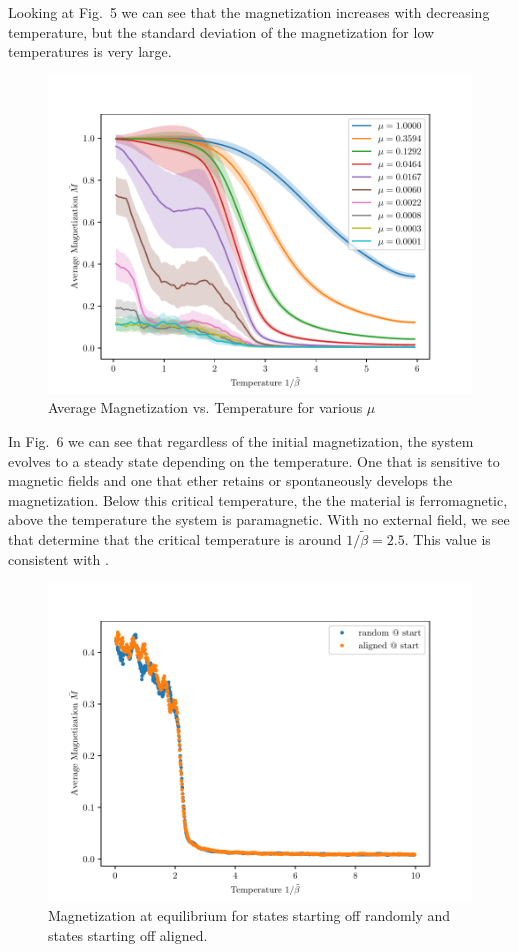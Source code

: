 \documentclass{llncs}
\begin{document}
Looking at Fig.~5 we can see that the magnetization increases with decreasing temperature, but the standard deviation of the magnetization for low temperatures is very large. 

\begin{figure}[h!]
	\centering
	\includegraphics[scale=0.75]{images/magnet.pdf}
	\caption{Average Magnetization vs. Temperature for various $\mu$}
\end{figure}

In Fig.~6 we can see that regardless of the initial magnetization, the system evolves to a steady state depending on the temperature. One that is sensitive to magnetic fields and one that ether retains or spontaneously develops the magnetization. Below this critical temperature, the the material is ferromagnetic, above the temperature the system is paramagnetic. With no external field, we see that determine that the critical temperature is around $1/\tilde\beta= 2.5$. This value is consistent with \cite{onsager}. 

\begin{figure}[h!]
	\centering
	\includegraphics[scale=0.75]{images/ferropara.pdf}
	\caption{Magnetization at equilibrium for states starting off randomly and states starting off aligned. }
\end{figure}
\end{document}
